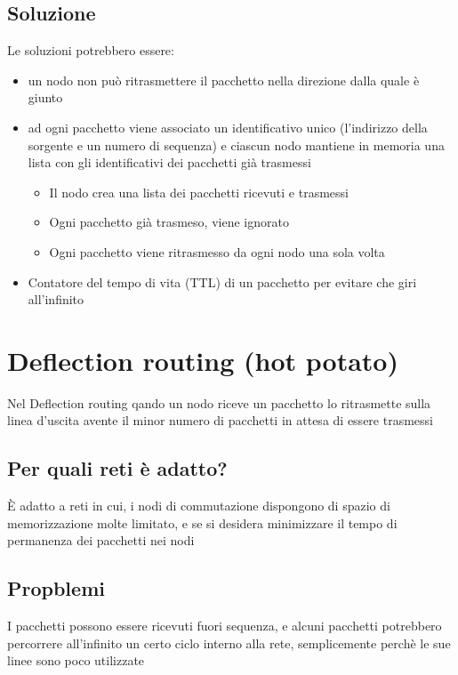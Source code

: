 \documentclass{report}
\begin{document}
            \subsection{Soluzione}
                Le soluzioni potrebbero essere:
                \begin{itemize}
                    \item un nodo non può ritrasmettere il pacchetto nella direzione dalla quale è giunto
                    \item ad ogni pacchetto viene associato un identificativo unico (l'indirizzo della sorgente e un numero di sequenza) e ciascun nodo mantiene in memoria una lista con gli identificativi dei pacchetti già trasmessi
                    \begin{itemize}
                        \item Il nodo crea una lista dei pacchetti ricevuti e trasmessi
                        \item  Ogni pacchetto già trasmeso, viene ignorato
                        \item Ogni pacchetto viene ritrasmesso da ogni nodo una sola volta
                    \end{itemize}
                    \item Contatore del tempo di vita (TTL) di un pacchetto per evitare che giri all'infinito
                \end{itemize}
        \section{Deflection routing (hot potato)}
            Nel Deflection routing qando un nodo riceve un pacchetto lo ritrasmette sulla linea d'uscita avente il minor numero di pacchetti in attesa di essere trasmessi
            \subsection{Per quali reti è adatto?}
                È adatto a reti in cui, i nodi di commutazione dispongono di spazio di memorizzazione molte limitato, e se si desidera minimizzare il tempo di permanenza dei pacchetti nei nodi
            \subsection{Propblemi}
                I pacchetti possono essere ricevuti fuori sequenza, e alcuni pacchetti potrebbero percorrere all'infinito un certo ciclo interno alla rete, semplicemente perchè le sue linee sono poco utilizzate
\end{document}
